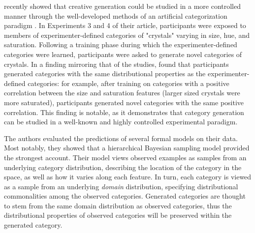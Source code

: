 \documentclass[12pt]{article}
\begin{document}
\begin{flushleft}
\cite{jern2013probabilistic} recently showed that creative generation could be studied in a more controlled manner through the well-developed methods of an artificial categorization paradigm \citep[see][for a review]{kurtz2015human}. In Experiments 3 and 4 of their article, participants were exposed to members of experimenter-defined categories of "crystals" varying in size, hue, and saturation. Following a training phase during which the experimenter-defined categories were learned, participants were asked to generate novel categories of crystals. In a finding mirroring that of the \cite{ward1994structured} studies, \citeauthor{jern2013probabilistic} found that participants generated categories with the same distributional properties as the experimenter-defined categories: for example, after training on categories with a positive correlation between the size and saturation features (larger sized crystals were more saturated), participants generated novel categories with the same positive correlation. This finding is notable, as it demonstrates that category generation can be studied in a well-known and highly controlled experimental paradigm. 


The authors evaluated the predictions of several formal models on their data. Most notably, they showed that a hierarchical Bayesian sampling model provided the strongest account. Their model views observed examples as samples from an underlying category distribution, describing the location of the category in the space, as well as how it varies along each feature. In turn, each category is viewed as a sample from an underlying \textit{domain} distribution, specifying distributional commonalities among the observed categories. Generated categories are thought to stem from the same domain distribution as observed categories, thus the distributional properties of observed categories will be preserved within the generated category.


\end{flushleft}
\end{document}
